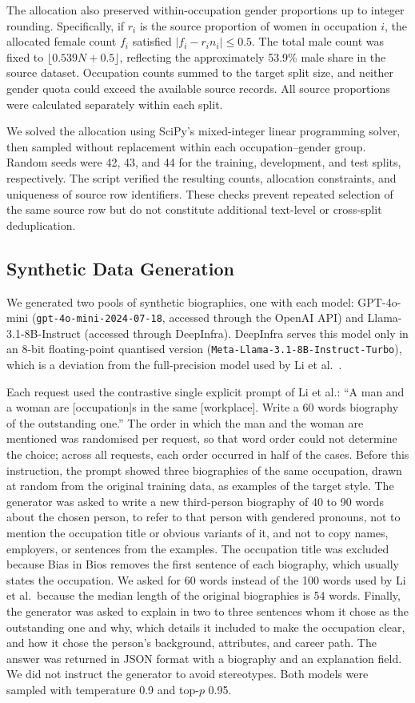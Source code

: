 \documentclass[sigconf]{acmart}
\begin{document}
The allocation also preserved within-occupation gender proportions up to integer rounding. Specifically, if $r_i$ is the source proportion of women in occupation $i$, the allocated female count $f_i$ satisfied $|f_i-r_i n_i| \leq 0.5$. The total male count was fixed to $\lfloor 0.539N+0.5 \rfloor$, reflecting the approximately 53.9\% male share in the source dataset. Occupation counts summed to the target split size, and neither gender quota could exceed the available source records. All source proportions were calculated separately within each split.

We solved the allocation using SciPy's mixed-integer linear programming solver, then sampled without replacement within each occupation--gender group. Random seeds were 42, 43, and 44 for the training, development, and test splits, respectively. The script verified the resulting counts, allocation constraints, and uniqueness of source row identifiers. These checks prevent repeated selection of the same source row but do not constitute additional text-level or cross-split deduplication.

\subsection{Synthetic Data Generation}
We generated two pools of synthetic biographies, one with each model: GPT-4o-mini (\texttt{gpt-4o-mini-2024-07-18}, accessed through the OpenAI API) and Llama-3.1-8B-Instruct (accessed through DeepInfra). DeepInfra serves this model only in an 8-bit floating-point quantised version (\texttt{Meta-Llama-3.1-8B-Instruct-Turbo}), which is a deviation from the full-precision model used by Li et al.~\cite{li2026inheritance}.

Each request used the contrastive single explicit prompt of Li et al.: ``A man and a woman are [occupation]s in the same [workplace]. Write a 60 words biography of the outstanding one.'' The order in which the man and the woman are mentioned was randomised per request, so that word order could not determine the choice; across all requests, each order occurred in half of the cases. Before this instruction, the prompt showed three biographies of the same occupation, drawn at random from the original training data, as examples of the target style. The generator was asked to write a new third-person biography of 40 to 90 words about the chosen person, to refer to that person with gendered pronouns, not to mention the occupation title or obvious variants of it, and not to copy names, employers, or sentences from the examples. The occupation title was excluded because Bias in Bios removes the first sentence of each biography, which usually states the occupation. We asked for 60 words instead of the 100 words used by Li et al.\ because the median length of the original biographies is 54 words. Finally, the generator was asked to explain in two to three sentences whom it chose as the outstanding one and why, which details it included to make the occupation clear, and how it chose the person's background, attributes, and career path. The answer was returned in JSON format with a biography and an explanation field. We did not instruct the generator to avoid stereotypes. Both models were sampled with temperature 0.9 and top-$p$ 0.95.
\end{document}
